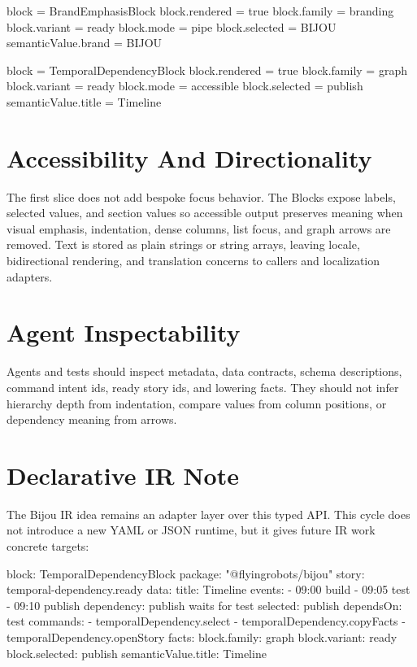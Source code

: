 \begin{CodeBlock}
block = BrandEmphasisBlock
block.rendered = true
block.family = branding
block.variant = ready
block.mode = pipe
block.selected = BIJOU
semanticValue.brand = BIJOU
\end{CodeBlock}

\begin{CodeBlock}
block = TemporalDependencyBlock
block.rendered = true
block.family = graph
block.variant = ready
block.mode = accessible
block.selected = publish
semanticValue.title = Timeline
\end{CodeBlock}

\section{Accessibility And Directionality}\label{record-099-accessibility-and-directionality}

The first slice does not add bespoke focus behavior. The Blocks expose labels, selected values, and section values so accessible output preserves meaning when visual emphasis, indentation, dense columns, list focus, and graph arrows are removed. Text is stored as plain strings or string arrays, leaving locale, bidirectional rendering, and translation concerns to callers and localization adapters.

\section{Agent Inspectability}\label{record-099-agent-inspectability}

Agents and tests should inspect metadata, data contracts, schema descriptions, command intent ids, ready story ids, and lowering facts. They should not infer hierarchy depth from indentation, compare values from column positions, or dependency meaning from arrows.

\section{Declarative IR Note}\label{record-099-declarative-ir-note}

The Bijou IR idea remains an adapter layer over this typed API. This cycle does not introduce a new YAML or JSON runtime, but it gives future IR work concrete targets:

\begin{CodeBlock}
block: TemporalDependencyBlock
package: "@flyingrobots/bijou"
story: temporal-dependency.ready
data:
  title: Timeline
  events:
    - 09:00 build
    - 09:05 test
    - 09:10 publish
  dependency: publish waits for test
  selected: publish
  dependsOn: test
commands:
  - temporalDependency.select
  - temporalDependency.copyFacts
  - temporalDependency.openStory
facts:
  block.family: graph
  block.variant: ready
  block.selected: publish
  semanticValue.title: Timeline
\end{CodeBlock}


